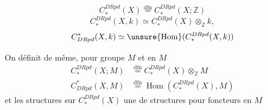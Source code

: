 \[
 C_*^{DRpd}(X)\overset{\mathrm{dfn}}=C_*^{DRpd}(X;\mathbb Z)
\]
\[
 C_*^{DRpd}(X,k)\simeq C_*^{DRpd}(X)\otimes_{\mathbb Z}k,
\]
\[
 C^*_{DRpd}(X,k)\simeq\unsure{\operatorname{Hom}}(C_*^{DRpd}(X,k))
\]

On définit de même, pour  groupe  $M$ et  en $M$
\[
\begin{aligned}
 C_*^{DRpd}(X;M)&\overset{\mathrm{dfn}}=C_*^{DRpd}(X)\otimes_{\mathbb Z}M\\
 C^*_{DRpd}(X,M)&\overset{\mathrm{dfn}}=\operatorname{Hom}(C_*^{DRpd}(X),M)
\end{aligned}
\]
et les structures sur $C_*^{DRpd}(X)$  une  de structures  pour  foncteurs en $M$ \unsure{\ldots}

